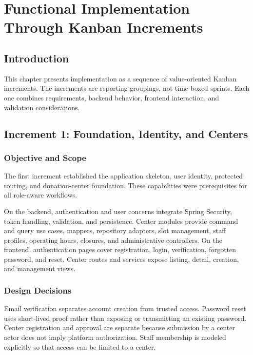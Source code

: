 \chapter{Functional Implementation Through Kanban Increments}

\section*{Introduction}
This chapter presents implementation as a sequence of value-oriented Kanban increments. The increments are reporting groupings, not time-boxed sprints. Each one combines requirements, backend behavior, frontend interaction, and validation considerations.

\section{Increment 1: Foundation, Identity, and Centers}
\subsection{Objective and Scope}
The first increment established the application skeleton, user identity, protected routing, and donation-center foundation. These capabilities were prerequisites for all role-aware workflows.

On the backend, authentication and user concerns integrate Spring Security, token handling, validation, and persistence. Center modules provide command and query use cases, mappers, repository adapters, slot management, staff profiles, operating hours, closures, and administrative controllers. On the frontend, authentication pages cover registration, login, verification, forgotten password, and reset. Center routes and services expose listing, detail, creation, and management views.

\subsection{Design Decisions}
Email verification separates account creation from trusted access. Password reset uses short-lived proof rather than exposing or transmitting an existing password. Center registration and approval are separate because submission by a center actor does not imply platform authorization. Staff membership is modeled explicitly so that access can be limited to a center.


